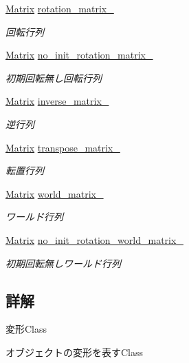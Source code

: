 \begin{DoxyCompactItemize}
\mbox{\hyperlink{class_matrix}{Matrix}} \mbox{\hyperlink{class_transform_a58e41c4d959a094c8dc1b2178fcb4fc2}{rotation\+\_\+matrix\+\_\+}}
\begin{DoxyCompactList}\small\item\em 回転行列 \end{DoxyCompactList}\item 
\mbox{\hyperlink{class_matrix}{Matrix}} \mbox{\hyperlink{class_transform_a0e893bc920666b3a4295cdf383441198}{no\+\_\+init\+\_\+rotation\+\_\+matrix\+\_\+}}
\begin{DoxyCompactList}\small\item\em 初期回転無し回転行列 \end{DoxyCompactList}\item 
\mbox{\hyperlink{class_matrix}{Matrix}} \mbox{\hyperlink{class_transform_a0b1d18a3f04fa8b38e6c8c1cd6d51a51}{inverse\+\_\+matrix\+\_\+}}
\begin{DoxyCompactList}\small\item\em 逆行列 \end{DoxyCompactList}\item 
\mbox{\hyperlink{class_matrix}{Matrix}} \mbox{\hyperlink{class_transform_abc32fce01f3c1ab82fed2f4b6dca1871}{transpose\+\_\+matrix\+\_\+}}
\begin{DoxyCompactList}\small\item\em 転置行列 \end{DoxyCompactList}\item 
\mbox{\hyperlink{class_matrix}{Matrix}} \mbox{\hyperlink{class_transform_a3a429ea1108d116f0b099b7a8fc8b477}{world\+\_\+matrix\+\_\+}}
\begin{DoxyCompactList}\small\item\em ワールド行列 \end{DoxyCompactList}\item 
\mbox{\hyperlink{class_matrix}{Matrix}} \mbox{\hyperlink{class_transform_a73e621ceb673d8e8546831d536d9b47e}{no\+\_\+init\+\_\+rotation\+\_\+world\+\_\+matrix\+\_\+}}
\begin{DoxyCompactList}\small\item\em 初期回転無しワールド行列 \end{DoxyCompactList}\end{DoxyCompactItemize}


\subsection{詳解}
変形\+Class 

オブジェクトの変形を表す\+Class 

